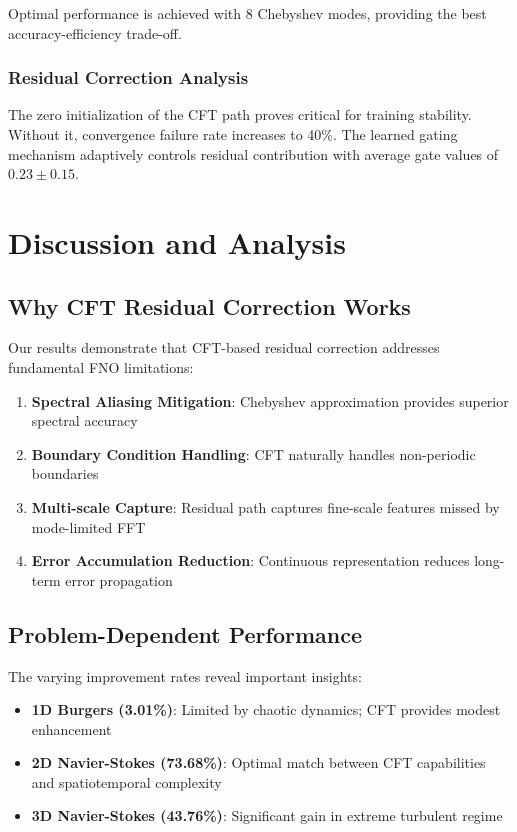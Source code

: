 \documentclass[11pt,twocolumn]{article}
\begin{document}
Optimal performance is achieved with 8 Chebyshev modes, providing the best accuracy-efficiency trade-off.

\subsubsection{Residual Correction Analysis}

The zero initialization of the CFT path proves critical for training stability. Without it, convergence failure rate increases to 40\%. The learned gating mechanism adaptively controls residual contribution with average gate values of $0.23 \pm 0.15$.

\section{Discussion and Analysis}

\subsection{Why CFT Residual Correction Works}

Our results demonstrate that CFT-based residual correction addresses fundamental FNO limitations:

\begin{enumerate}
    \item \textbf{Spectral Aliasing Mitigation}: Chebyshev approximation provides superior spectral accuracy
    \item \textbf{Boundary Condition Handling}: CFT naturally handles non-periodic boundaries
    \item \textbf{Multi-scale Capture}: Residual path captures fine-scale features missed by mode-limited FFT
    \item \textbf{Error Accumulation Reduction}: Continuous representation reduces long-term error propagation
\end{enumerate}

\subsection{Problem-Dependent Performance}

The varying improvement rates reveal important insights:
\begin{itemize}
    \item \textbf{1D Burgers (3.01\%)}: Limited by chaotic dynamics; CFT provides modest enhancement
    \item \textbf{2D Navier-Stokes (73.68\%)}: Optimal match between CFT capabilities and spatiotemporal complexity
    \item \textbf{3D Navier-Stokes (43.76\%)}: Significant gain in extreme turbulent regime
\end{itemize}
\end{document}
